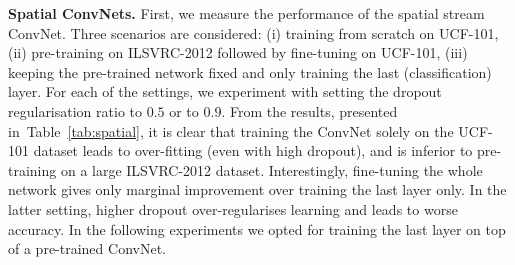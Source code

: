 \documentclass{article} %
\newcommand{\tblref}[1]{Table~\ref{#1}}
\begin{document}
\noindent\textbf{Spatial ConvNets.}
First, we measure the performance of the spatial stream ConvNet.
Three scenarios are considered:
(i) training from scratch on UCF-101, 
(ii) pre-training on ILSVRC-2012 followed by fine-tuning on UCF-101, 
(iii) keeping the pre-trained network fixed and only training the last (classification) layer.  
For each of the settings, we experiment with setting the dropout
regularisation ratio to $0.5$ or to $0.9$.  
From the results,
presented in~\tblref{tab:spatial}, it is clear that training the
ConvNet solely on the UCF-101 dataset leads to over-fitting (even with
high dropout), and is inferior to pre-training on a large ILSVRC-2012
dataset. Interestingly, fine-tuning the whole network gives only
marginal improvement over training the last layer only.
In the latter setting, higher dropout over-regularises learning and leads to worse accuracy. 
In the following experiments we opted for training the last layer on top of a pre-trained ConvNet.
\end{document}
